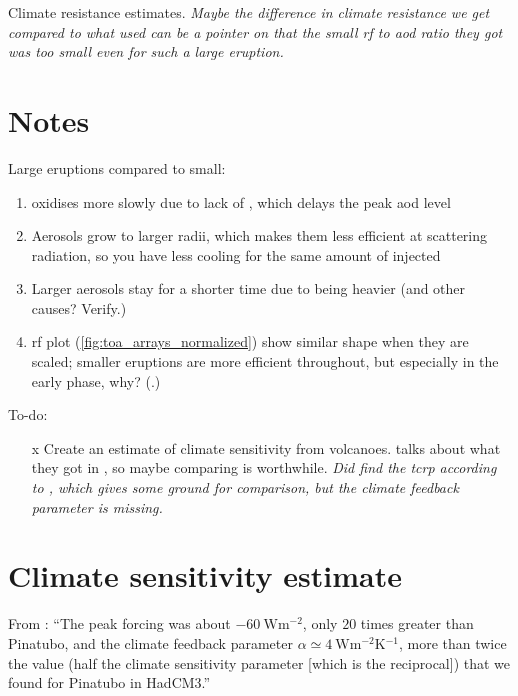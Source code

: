 \documentclass{ametsocV5}
\newcommand{\iso}[1][i]{{#1}njected \ce{SO2}}
\begin{document}
Climate resistance estimates. \emph{Maybe the difference in climate resistance we get
  compared to what \citet{jones2005} used can be a pointer on that the small \ac{rf} to
  \ac{aod} ratio they got was too small even for such a large eruption.}

\clearpage

\section*{Notes}

Large eruptions compared to small:

\begin{enumerate}
  \item {} oxidises more slowly due to lack of , which delays the peak \ac{aod}
        level
  \item Aerosols grow to larger radii, which makes them less efficient at scattering radiation,
        so you have less cooling for the same amount of \iso{}
  \item Larger aerosols stay for a shorter time due to being heavier (and other causes? Verify.)
  \item \ac{rf} plot (\cref{fig:toa_arrays_normalized}) show similar shape when they are scaled;
        smaller eruptions are more efficient throughout, but especially in the early phase, why?
        (.)
\end{enumerate}

To-do:

\begin{itemize}
  \item[\lbrack{}x\rbrack{}] Create an estimate of climate sensitivity from volcanoes.
    \citet{gregory2016} talks about what they got in \citet{jones2005}, so maybe comparing
    is worthwhile. \emph{Did find the \ac{tcrp} according to \citet{merlis2014}, which gives
      some ground for comparison, but the climate feedback parameter is missing.}
\end{itemize}

\section*{Climate sensitivity estimate}

From \citet{gregory2016}: ``The peak forcing was about \(\SI{-60}{\watt\metre^{-2}}\),
only \(20\) times greater than Pinatubo, and the climate feedback parameter \(\alpha
\simeq \SI{4}{\watt\metre^{-2}\kelvin^{-1}}\), more than twice the value (half the
climate sensitivity parameter [which is the reciprocal]) that we found for Pinatubo in
HadCM3.''
\end{document}
